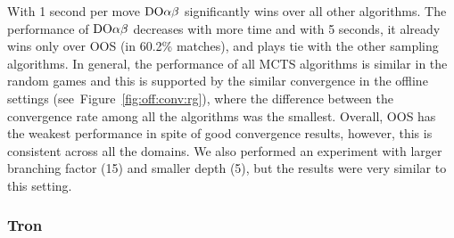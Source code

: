 With 1 second per move $\textrm{DO}\alpha\beta$ significantly wins over all other algorithms. 
The performance of $\textrm{DO}\alpha\beta$ decreases with more time and with 5 seconds, it already wins only over OOS (in 60.2\% matches), and plays tie with the other sampling algorithms. 
In general, the performance of all MCTS algorithms is similar in the random games and this is supported by the similar convergence in the offline settings (see~Figure~\ref{fig:off:conv:rg}), where the difference between the convergence rate among all the algorithms was the smallest.
Overall, OOS has the weakest performance in spite of good convergence results, however, this is consistent across all the domains.
We also performed an experiment with larger branching factor (15) and smaller depth (5), but the results were very similar to this setting.

\subsubsection{Tron}

